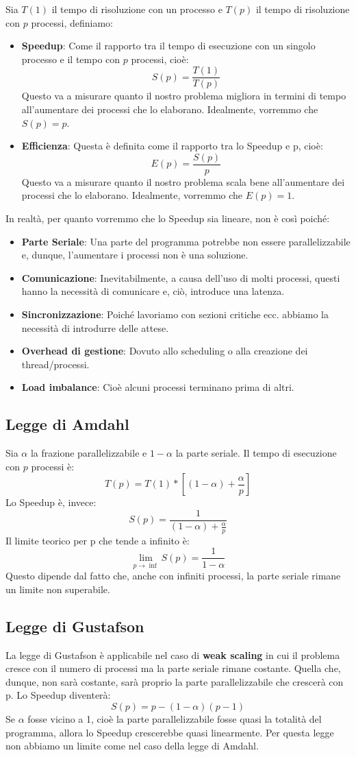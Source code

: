 Sia $T(1)$ il tempo di risoluzione con un processo e $T(p)$ il tempo di risoluzione con $p$ processi, definiamo:
\begin{itemize}
    \item \textbf{Speedup}: Come il rapporto tra il tempo di esecuzione con un singolo processo e il tempo con $p$ processi, cioè:
    \[S(p) = \frac{T(1)}{T(p)}\]
    Questo va a misurare quanto il nostro problema migliora in termini di tempo all'aumentare dei processi che lo elaborano. Idealmente, vorremmo che $S(p) = p$.
    \item \textbf{Efficienza}: Questa è definita come il rapporto tra lo Speedup e p, cioè:
    \[E(p)=\frac{S(p)}{p}\]
    Questo va a misurare quanto il nostro problema scala bene all'aumentare dei processi che lo elaborano. Idealmente, vorremmo che $E(p)=1$.
\end{itemize}
In realtà, per quanto vorremmo che lo Speedup sia lineare, non è così poiché:
\begin{itemize}
    \item \textbf{Parte Seriale}: Una parte del programma potrebbe non essere parallelizzabile e, dunque, l'aumentare i processi non è una soluzione.
    \item \textbf{Comunicazione}: Inevitabilmente, a causa dell'uso di molti processi, questi hanno la necessità di comunicare e, ciò, introduce una latenza.
    \item \textbf{Sincronizzazione}: Poiché lavoriamo con sezioni critiche ecc. abbiamo la necessità di introdurre delle attese.
    \item \textbf{Overhead di gestione}: Dovuto allo scheduling o alla creazione dei thread/processi.
    \item \textbf{Load imbalance}: Cioè alcuni processi terminano prima di altri.
\end{itemize}
\subsection*{Legge di Amdahl}
Sia $\alpha$ la frazione parallelizzabile e $1-\alpha$ la parte seriale. Il tempo di esecuzione con $p$ processi è:
\[T(p)=T(1)* [(1-\alpha)+\frac{\alpha}{p}] \]
Lo Speedup è, invece:
\[S(p)=\frac{1}{(1-\alpha)+\frac{\alpha}{p}}\]
Il limite teorico per p che tende a infinito è:
\[\lim_{p\to \inf}S(p)= \frac{1}{1-\alpha}\]
Questo dipende dal fatto che, anche con infiniti processi, la parte seriale rimane un limite non superabile.
\subsection*{Legge di Gustafson}
La legge di Gustafson è applicabile nel caso di \textbf{weak scaling} in cui il problema cresce con il numero di processi ma la parte seriale rimane costante. Quella che, dunque, non sarà costante, sarà proprio la parte parallelizzabile che crescerà con p.
Lo Speedup diventerà:
\[S(p)=p-(1-\alpha)(p-1)\]
Se $\alpha$ fosse vicino a 1, cioè la parte parallelizzabile fosse quasi la totalità del programma, allora lo Speedup crescerebbe quasi linearmente. Per questa legge non abbiamo un limite come nel caso della legge di Amdahl.

